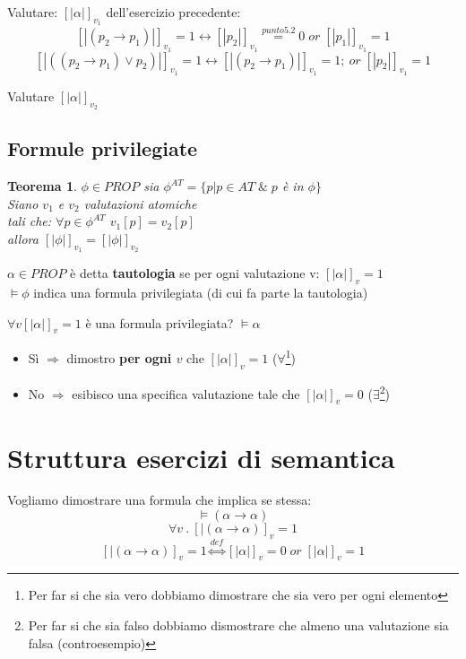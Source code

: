 \documentclass{article}
\newtheorem{theorem}{Teorema}
\theoremstyle{break}
\theoremstyle{break}
\theoremstyle{break}
\theoremstyle{break}
\begin{document}
\begin{exercise}
	Valutare: \( [|\alpha|]_{v_1} \) dell'esercizio precedente:
	\[ [|(p_2 \to p_1)|]_{v_1}=1 \leftrightarrow [|p_2|]_{v_1}\stackrel{punto 5.2}{=} 0\; or\; [|p_1|]_{v_1}=1 \]
	\[ [|((p_2 \to p_1)\vee p_2)|]_{v_1} = 1 \leftrightarrow [|(p_2 \to p_1)|]_{v_1}=1;\ or\; [|p_2|]_{v_1}=1 \]
\end{exercise}

\begin{exercise}[A casa]
	Valutare \( [|\alpha|]_{v_2} \)
\end{exercise}


\subsection{Formule privilegiate}
\begin{theorem}
	\( \phi \in PROP \) sia \( \phi^{AT} = \{ p | p \in AT\; \&\; p \) è in \( \phi\} \) \\
	Siano \( v_1 \) e \( v_2 \) valutazioni atomiche\\
	tali che: \( \forall p \in \phi^{AT} \) \( v_1[p]=v_2[p] \) \\
	allora \( [|\phi|]_{v_1} = [|\phi|]_{v_2} \)
\end{theorem}

\begin{definition}
	\( \alpha \in PROP \) è detta \textbf{tautologia} se per ogni valutazione
	v: \( [|\alpha|]_v = 1 \)\\
	\(
	\models \phi
	\) indica una formula privilegiata (di cui fa parte la tautologia)
\end{definition}

\( \forall v [|\alpha|]_v = 1 \) è una formula privilegiata? \( \models \alpha \)
\begin{itemize}
	\item Sì \( \Rightarrow \) dimostro \textbf{per ogni \( v \)} che \( [|\alpha|]_v = 1\) (\( \forall  \)\footnote{Per far si che sia vero
		      dobbiamo dimostrare che sia vero per ogni elemento})
	\item No \( \Rightarrow \) esibisco una specifica valutazione
	      tale che \( [|\alpha|]_v= 0 \) (\( \exists  \)\footnote{Per far si che sia falso
		      dobbiamo dismostrare che almeno una valutazione sia falsa (controesempio)})
\end{itemize}

\section{Struttura esercizi di semantica}
\begin{exercise}
	Vogliamo dimostrare una formula che implica se stessa:
	\[
		\models (\alpha \to \alpha)
	\]
	\[ \forall v\: . \: [|(\alpha \to \alpha)]_v = 1 \]
	\[
		[|(\alpha \to \alpha)]_v = 1 \stackrel{def}{\Leftrightarrow} [|\alpha|]_v=0\; or\; [|\alpha|]_v=1
	\]
\end{exercise}
\end{document}

